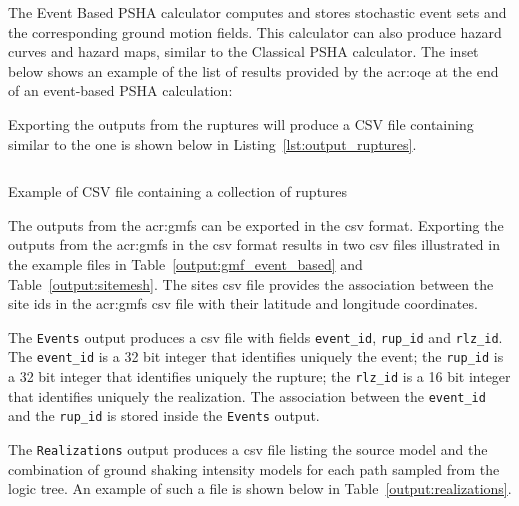 The Event Based PSHA calculator computes and stores stochastic event sets and
the corresponding ground motion fields. This calculator can also produce
hazard curves and hazard maps, similar to the 
Classical PSHA calculator. The inset below shows an example of the list of
results provided by the \gls{acr:oqe} at the end of an event-based PSHA
calculation:



Exporting the outputs from the ruptures will produce a CSV file containing
similar to the one is shown below in Listing~\ref{lst:output_ruptures}.


\begin{listing}[htbp]
  \inputminted[firstline=1,firstnumber=1,fontsize=\footnotesize,frame=single,linenos,bgcolor=lightgray]{xml}{oqum/hazard/verbatim/output_ses.csv}
  \caption{Example of CSV file containing a collection of ruptures}
  \label{lst:output_ruptures}
\end{listing}

The outputs from the \glspl{acr:gmf} can be exported in the csv
format. Exporting the outputs from the \glspl{acr:gmf} in the 
csv format results in two csv files illustrated in the example files in
Table~\ref{output:gmf_event_based} and Table~\ref{output:sitemesh}. The sites csv
file provides the association between the site ids in the \glspl{acr:gmf} csv
file with their latitude and longitude coordinates.



The \texttt{Events} output produces a csv file with fields \texttt{event\_id},
\texttt{rup\_id} and \texttt{rlz\_id}. The \texttt{event\_id} is a 32 bit
integer that identifies uniquely the event; the \texttt{rup\_id}
is a 32 bit integer that identifies uniquely the rupture; the \texttt{rlz\_id}
is a 16 bit integer that identifies uniquely the
realization. The association between the \texttt{event\_id} and
the  \texttt{rup\_id} is stored inside the \texttt{Events} output.

The \texttt{Realizations} output produces a csv file listing the source model
and the combination of ground shaking intensity models for each path sampled
from the logic tree. An example of such a file is shown below in
Table~\ref{output:realizations}.


